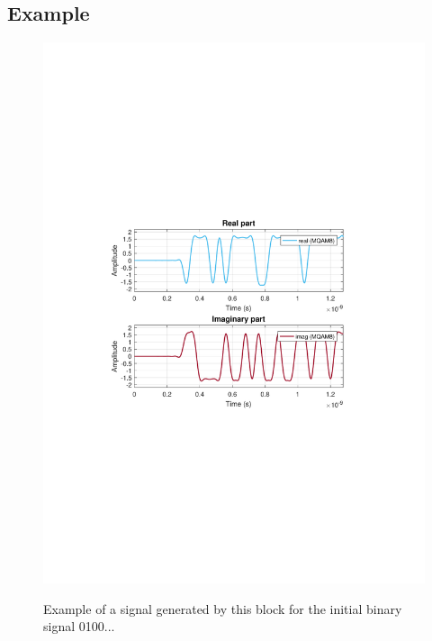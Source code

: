 \subsection*{Example}
\begin{figure}[h]
	\centering
	\includegraphics[clip, trim=0.5cm 9cm 0.5cm 9cm, width=\textwidth]{./lib/iq_modulator/figures/MQAM_iq_modulator_output.pdf}
	\label{MQAM8_DeterministicAppendZeros}\caption{Example of a signal generated by this block for the initial binary signal 0100...}
\end{figure}

